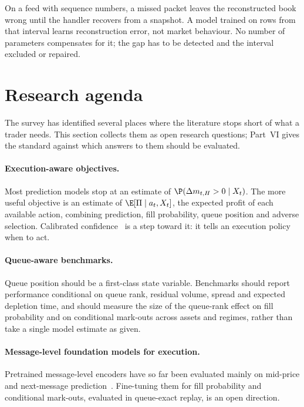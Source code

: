 \begin{example}
On a feed with sequence numbers, a missed packet leaves the reconstructed book wrong until the
handler recovers from a snapshot. A model trained on rows from that interval learns
reconstruction error, not market behaviour. No number of parameters compensates for it; the gap
has to be detected and the interval excluded or repaired.
\end{example}

\section{Research agenda}
\label{sec:agenda}

The survey has identified several places where the literature stops short of what a trader needs.
This section collects them as open research questions; Part~VI gives the standard against which
answers to them should be evaluated.

\paragraph{Execution-aware objectives.} Most prediction models stop at
an estimate of $\P(\Delta m_{t,H} > 0 \mid X_t)$. The more useful objective is an estimate of
$\E[\Pi \mid a_t, X_t]$, the expected profit of each available action,
combining prediction, fill probability, queue position and adverse selection. Calibrated
confidence~\citep{manoharan2026uqlob} is a step toward it: it tells an execution policy when to act.

\paragraph{Queue-aware benchmarks.} Queue position should be a first-class state variable.
Benchmarks should report performance conditional on queue rank, residual volume, spread and expected
depletion time, and should measure the size of the queue-rank effect on fill probability and on
conditional mark-outs across assets and regimes, rather than take a single model estimate as
given.

\paragraph{Message-level foundation models for execution.} Pretrained message-level encoders have
so far been evaluated mainly on mid-price and next-message prediction~\citep{linna2025lobert}.
Fine-tuning them for fill probability and conditional mark-outs, evaluated in queue-exact replay,
is an open direction.

